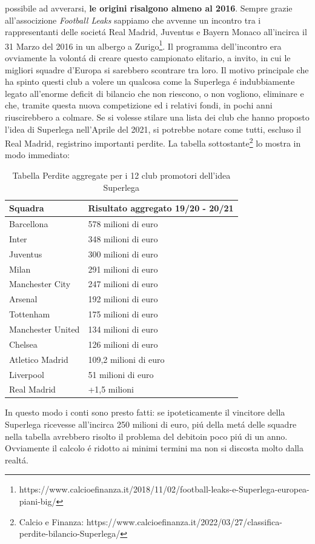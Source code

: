 \documentclass[
    corpo=12pt,
    oneside,
    evenboxes,
    tipotesi=triennale,
    stile=classica,
    oldstyle,
    autoretitolo,
    greek,
]{toptesi}
\begin{document}
\begin{interlinea}{1.5}
possibile ad avverarsi, \textbf{le origini risalgono almeno al 2016}. Sempre grazie all'associzione \emph{Football Leaks} sappiamo che avvenne un incontro tra i 
rappresentanti delle societ\'a Real Madrid, Juventus e Bayern Monaco all'incirca il 31 Marzo del 2016 in un albergo a Zurigo\footnote{https://www.calcioefinanza.it/2018/11/02/football-leaks-e-Superlega-europea-piani-big/}. Il programma
dell'incontro era ovviamente la volont\'a di creare questo campionato elitario, a invito, in cui le migliori squadre d'Europa si sarebbero scontrare tra loro.\newline
Il motivo principale che ha spinto questi club a volere un qualcosa come la Superlega \'e indubbiamente legato all'enorme deficit
di bilancio che non riescono, o non vogliono, eliminare e che, tramite questa nuova competizione ed i relativi fondi, in pochi anni riuscirebbero a colmare.
Se si volesse stilare una lista dei club che hanno proposto l'idea di Superlega nell'Aprile del 2021, si potrebbe notare come tutti, escluso 
il Real Madrid, registrino importanti perdite. La tabella sottostante\footnote{Calcio e Finanza: https://www.calcioefinanza.it/2022/03/27/classifica-perdite-bilancio-Superlega/} lo mostra in modo immediato:\newpage
\begin{table}
    \begin{tabularx}{\textwidth}{XX}
        \toprule
        \textbf{Squadra} & \textbf{Risultato aggregato 19/20 - 20/21} \\
        \midrule
        Barcellona & 578 milioni di euro \\
        \midrule
        Inter & 348 milioni di euro \\
        \midrule
        Juventus & 300 milioni di euro \\
        \midrule
        Milan & 291 milioni di euro \\
        \midrule
        Manchester City & 247 milioni di euro \\
        \midrule
        Arsenal & 192 milioni di euro \\
        \midrule
        Tottenham & 175 milioni di euro \\
        \midrule
        Manchester United & 134 milioni di euro \\
        \midrule
        Chelsea & 126 milioni di euro \\
        \midrule
        Atletico Madrid & 109,2 milioni di euro \\
        \midrule
        Liverpool & 51 milioni di euro \\
        \midrule
        Real Madrid & +1,5 milioni \\
        \bottomrule
    \end{tabularx}
    \caption{Tabella Perdite aggregate per i 12 club promotori dell'idea Superlega}
    \label{tabella_ris_sl}
\end{table}
In questo modo i conti sono presto fatti: se ipoteticamente il vincitore della Superlega ricevesse all'incirca 250 milioni di euro, pi\'u
della met\'a delle squadre nella tabella avrebbero risolto il problema del debitoin poco pi\'u di un anno. Ovviamente il calcolo \'e ridotto ai minimi termini ma non 
si discosta molto dalla realt\'a.

\end{interlinea}
\end{document}
